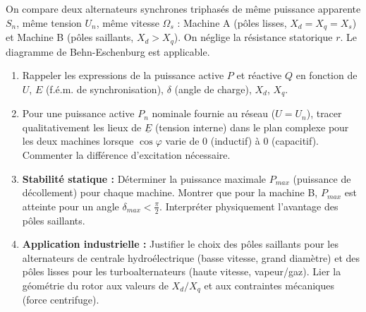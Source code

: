 \documentclass[11pt]{article}
\begin{document}
\begin{exercice}
On compare deux alternateurs synchrones triphasés de même puissance apparente $S_n$, même tension $U_n$, même vitesse $\Omega_s$ : Machine A (pôles lisses, $X_d = X_q = X_s$) et Machine B (pôles saillants, $X_d > X_q$). On néglige la résistance statorique $r$. Le diagramme de Behn-Eschenburg est applicable.
\begin{enumerate}
    \item Rappeler les expressions de la puissance active $P$ et réactive $Q$ en fonction de $U$, $E$ (f.é.m. de synchronisation), $\delta$ (angle de charge), $X_d$, $X_q$.
    \item Pour une puissance active $P_n$ nominale fournie au réseau ($U=U_n$), tracer qualitativement les lieux de $\underline{E}$ (tension interne) dans le plan complexe pour les deux machines lorsque $\cos\varphi$ varie de $0$ (inductif) à $0$ (capacitif). Commenter la différence d'excitation nécessaire.
    \item \textbf{Stabilité statique :} Déterminer la puissance maximale $P_{max}$ (puissance de décollement) pour chaque machine. Montrer que pour la machine B, $P_{max}$ est atteinte pour un angle $\delta_{max} < \frac{\pi}{2}$. Interpréter physiquement l'avantage des pôles saillants.
    \item \textbf{Application industrielle :} Justifier le choix des pôles saillants pour les alternateurs de centrale hydroélectrique (basse vitesse, grand diamètre) et des pôles lisses pour les turboalternateurs (haute vitesse, vapeur/gaz). Lier la géométrie du rotor aux valeurs de $X_d/X_q$ et aux contraintes mécaniques (force centrifuge).
\end{enumerate}
\end{exercice}
\end{document}
